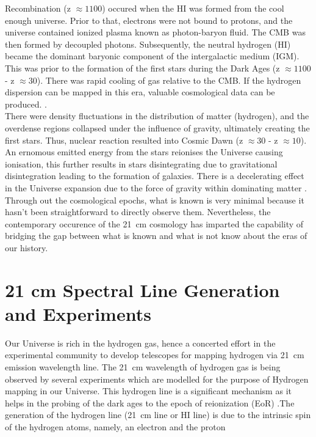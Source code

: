 \documentclass[12pt,a4paper]{report}
\begin{document}
		Recombination (z $\approx1100$) occured when the HI was formed from the cool enough universe. Prior to that, electrons were not bound to protons, and the universe contained ionized plasma known as photon-baryon fluid. The CMB was then formed by decoupled photons. Subsequently, the neutral hydrogen (HI) became the dominant baryonic component of the intergalactic medium (IGM). This was prior to the formation of the first stars during the Dark Ages (z $\approx1100$ - z $\approx30$). There was rapid cooling of gas relative to the CMB. If the hydrogen dispersion can be mapped in this era, valuable cosmological data can be produced. \cite{2015Sci...349..849H, 11, 2004PhRvL..92u1301L}.\\
				
		 There were density fluctuations in the distribution
		 of matter (hydrogen), and the overdense regions collapsed under the	influence of gravity, ultimately creating the first stars. Thus, nuclear reaction resulted into Cosmic Dawn (z $\approx30$ - z $\approx10$). An ernomous emitted energy from the stars reionises the Universe causing ionisation, this further results in stars disintegrating due to gravitational disintegration leading to the formation of galaxies. There is a decelerating effect in the Universe expansion due to the force of gravity within dominating matter \cite{2015Sci...349..849H, 2017arXiv170808521D}.\\
				
		Through out the cosmological epochs, what is known is very minimal because it hasn't been straightforward to directly observe them. Nevertheless, the contemporary occurence of the \SI{21}{cm} cosmology has imparted the capability of bridging the gap  between what is known and what is not know about the eras of our history\cite{2014ApJ...782L...9V, 2013PhRvD..87d3002L}.
		
	\section{21 cm Spectral Line Generation and Experiments}
		Our Universe is rich in the hydrogen gas, hence a
		concerted effort in the experimental community to develop telescopes for mapping hydrogen via \SI{21}{cm} emission  wavelength line. The \SI{21}{cm} wavelength of hydrogen gas is being observed by several experiments which are modelled for the purpose of Hydrogen mapping in our Universe. This hydrogen line is a significant mechanism as it helps in the probing of the dark ages to the epoch of reionization (EoR) \cite{2013PhRvD..87d3002L,2014ApJ...782...66P}.The generation of the hydrogen line (\SI{21}{cm} line or HI line) is due to the intrinsic spin of the hydrogen atoms, namely, an electron and the proton \cite{book:832129} 
		
\end{document}
